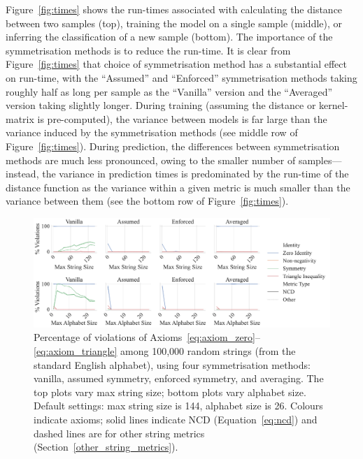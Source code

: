 \documentclass[preprint,12pt]{article}
\begin{document}
Figure~\ref{fig:times} shows the run-times associated with calculating the distance between two samples (top), training the model on a single sample (middle), or inferring the classification of a new sample (bottom).
The importance of the symmetrisation methods is to reduce the run-time.
It is clear from Figure~\ref{fig:times} that choice of symmetrisation method has a substantial effect on run-time, with the ``Assumed'' and ``Enforced'' symmetrisation methods taking roughly half as long per sample as the ``Vanilla'' version and the ``Averaged'' version taking slightly longer.
During training (assuming the distance or kernel-matrix is pre-computed), the variance between models is far large than the variance induced by the symmetrisation methods (see middle row of Figure~\ref{fig:times}).
During prediction, the differences between symmetrisation methods are much less pronounced, owing to the smaller number of samples---instead, the variance in prediction times is predominated by the run-time of the distance function as the variance within a given metric is much smaller than the variance between them (see the bottom row of Figure~\ref{fig:times}).

\begin{figure}[ht!]
    \centering
    \includegraphics[width=\textwidth]{images/synthetic_check.pdf}
    \caption{
   Percentage of violations of Axioms~\ref{eq:axiom_zero}--\ref{eq:axiom_triangle} among 100,000 random strings (from the standard English alphabet), using four symmetrisation methods: vanilla, assumed symmetry, enforced symmetry, and averaging. The top plots vary max string size; bottom plots vary alphabet size. Default settings: max string size is 144, alphabet size is 26. Colours indicate axioms; solid lines indicate NCD (Equation~\ref{eq:ncd}) and dashed lines are for other string metrics (Section~\ref{other_string_metrics}).
    }
    \label{fig:synthetic_check}
\end{figure}
\end{document}
